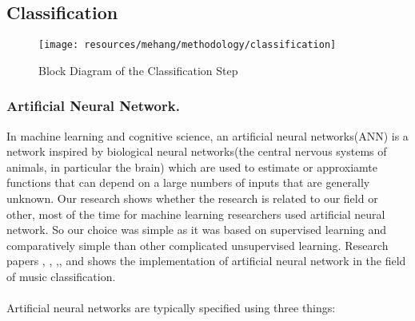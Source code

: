 \newpage


\subsection{Classification}
\begin{figure}[h!]
        \centering
        \texttt{[image: resources/mehang/methodology/classification]}
        \caption{Block Diagram of the Classification Step}
\end{figure}

\subsubsection{Artificial Neural Network.}
In machine learning and cognitive science, an artificial neural networks(ANN) is a network inspired by biological neural networks(the central nervous systems of 
animals, in particular the brain) which are used to estimate or approxiamte functions that can depend on a large numbers of inputs that are generally unknown.
Our research shows whether the research is related to our field or other, most of the time for machine learning researchers used artificial neural network.
So our choice was simple as it was based on supervised learning and comparatively simple than other complicated unsupervised learning.
Research papers \cite{Koerich2013}, \cite{Neumayer2004}, ,\cite{Anglade2010}, \cite{Haggblade2011} and \cite{Kour2015} shows the implementation of artificial neural network in the field of
music classification.\\
\\
Artificial neural networks are typically specified using three things:
